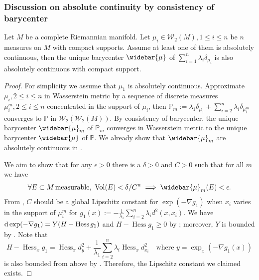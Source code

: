 \subsubsection{Discussion on absolute continuity by consistency of barycenter}

\begin{thm}
	\label{thm:absolute_continuity_discrete}
	Let $M$ be a complete Riemannian manifold.
	Let $\mu_i \in \mathcal{W}_2(M), 1 \leq i \leq n $ be $n$ measures on $M$ with compact supports.
	Assume at least one of them is absolutely continuous,
	then the unique barycenter $\widebar{\mu}$ of $\sum_{i=1}^n \lambda_i \delta_{\mu_i}$ is also absolutely continuous
	with compact support.
\end{thm}

\begin{proof}

	For simplicity we assume that $\mu_1$ is absolutely continuous.
	Approximate $\mu_i, 2 \leq i \leq n $ in Wasserstein metric by
	a sequence of discrete measures $\mu_i^{m}, 2 \leq i \leq n$
	concentrated in the support of $\mu_i$,
	then $\mathbb{P}_m := \lambda_1 \delta_{\mu_1} + \sum_{i = 2}^n \lambda_i \delta_{\mu_i^m}$ converges to $\mathbb{P}$
	in $\mathcal{W}_2(\mathcal{W}_2(M))$.
	By consistency of barycenter, the unique barycenter $\widebar{\mu}_m$ of $\mathbb{P}_m$
	converges in Wasserstein metric to the unique barycenter $\widebar{\mu}$ of $\mathbb{P}$.
	We already show that $\widebar{\mu}_m$ are absolutely continuous in .

	We aim to show that
	for any $\epsilon > 0$ there is a $\delta > 0$ and $C >0 $ such that for all $m$ we have
	\begin{equation}
		\label{equa:absolutely_continous}
		\forall E \subset M \, \text{measurable, } \operatorname{Vol}(E) < \delta / C^n
		\implies \widebar{\mu}_m(E) < \epsilon.
	\end{equation}
	From ,
	$C$ should be a global Lipschitz constant for $\exp(-\nabla g_1)$
	when $x_i$ varies in the support of $\mu_i^m$
	for $g_1(x):= - \frac{1}{\lambda_1} \sum_{i=2}^n \lambda_i d^2(x, x_i)$.
	We have $\operatorname{d} \exp(-\nabla g_1) = Y ( H - \operatorname{Hess}g_1)$
	and $H-\operatorname{Hess} g_1 \geq 0$
	by ;
	moreover, $Y$ is bounded by .
	Note that
	\[
		H-\operatorname{Hess}_x g_1=
		\operatorname{Hess}_xd^2_y + \frac{1}{\lambda_1} \sum_{i=2}^n \lambda_i \operatorname{Hess}_x d^2_{x_i}
		\quad \text{where }y=\exp_x( -\nabla g_1(x))
	\]
	is also bounded from above by .
	Therefore, the Lipschitz constant we claimed exists.


\end{proof}
